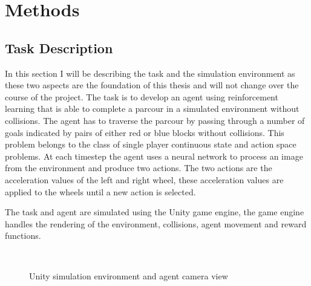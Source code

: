 \chapter{Methods}
\label{cha:Methods}



\section{Task Description}

In this section I will be describing the task and the simulation environment as these two aspects are the foundation of this thesis and will not change over the course of the project.
The task is to develop an agent using reinforcement learning that is able to complete a parcour in a simulated environment without collisions. The agent has to traverse the parcour by passing through a number of goals indicated by pairs of either red or blue blocks without collisions. This problem belongs to the class of single player continuous state and action space problems. At each timestep the agent uses a neural network to process an image from the environment and produce two actions. The two actions are the acceleration values of the left and right wheel, these acceleration values are applied to the wheels until a new action is selected.%

The task and agent are simulated using the Unity game engine, the game engine handles the rendering of the environment, collisions, agent movement and reward functions.


\begin{figure}
     \centering
          \qquad
          \\
     \caption{Unity simulation environment and agent camera view}
\end{figure}


